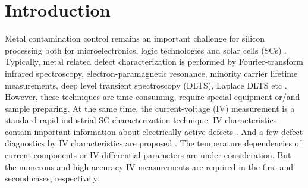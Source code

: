\documentclass[a4paper,fleqn]{cas-sc}
\begin{document}
\maketitle


\section{Introduction}


Metal  contamination control remains an important challenge for silicon processing both for microelectronics, logic technologies and solar cells (SCs) \citep{Claers2018,ZHU2016192,FeB:Schmidt,IronSC}.
Typically, metal related defect characterization is performed by Fourier-transform infrared spectroscopy,
electron-paramagnetic resonance,
minority carrier lifetime measurements,
deep level transient spectroscopy (DLTS),
Laplace DLTS etc \citep{Schroder2006,HowMuchPhysics,LaplDLTS}.
However, these techniques are time-consuming, require special equipment or/and sample preparing.
At the same time, the current-voltage (IV) measurement is a  standard  rapid industrial SC characterization technique.
IV characteristics contain important information about electrically active defects \citep{HowMuchPhysics,BulyarJAP}.
And a few  defect diagnostics by IV characteristics are proposed
\citep{HowMuchPhysics,BulyarJAP,BulyarSSE,Claeys2019,simoen2007}.
The temperature dependencies of current components \citep{Claeys2019,simoen2007}
or IV differential parameters \citep{BulyarJAP,BulyarSSE} are under consideration.
But the numerous and high accuracy IV measurements are required in the first and second cases, respectively.
\end{document}
